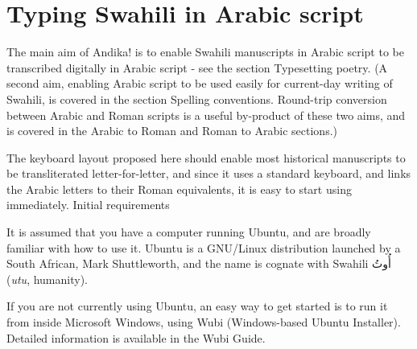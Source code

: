 \documentclass[a4paper,10pt]{article}
\newcommand{\AS}[1]{\fontspec[Script=Arabic, Scale=1.5]{Scheherazade} #1\normalfont} %
\begin{document}
\hangindent=3cm  %
\normalfont


\section{Typing Swahili in Arabic script}



The main aim of Andika! is to enable Swahili manuscripts in Arabic script to be transcribed digitally in Arabic script - see the section Typesetting poetry. (A second aim, enabling Arabic script to be used easily for current-day writing of Swahili, is covered in the section Spelling conventions. Round-trip conversion between Arabic and Roman scripts is a useful by-product of these two aims, and is covered in the Arabic to Roman and Roman to Arabic sections.)

The keyboard layout proposed here should enable most historical manuscripts to be transliterated letter-for-letter, and since it uses a standard keyboard, and links the Arabic letters to their Roman equivalents, it is easy to start using immediately.
Initial requirements

It is assumed that you have a computer running Ubuntu, and are broadly familiar with how to use it. Ubuntu is a GNU/Linux distribution launched by a South African, Mark Shuttleworth, and the name is cognate with Swahili\AS{أُوتُ} (\textit{utu}, humanity).

If you are not currently using Ubuntu, an easy way to get started is to run it from inside Microsoft Windows, using Wubi (Windows-based Ubuntu Installer). Detailed information is available in the Wubi Guide.
\end{document}
